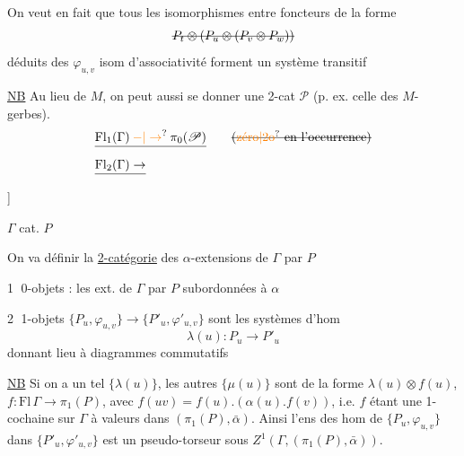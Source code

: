 On veut en fait que tous les isomorphismes
entre foncteurs de la
forme
\[
\deleted{P_t\otimes(P_u\otimes(P_v\otimes P_w))}
\]
déduits des $\varphi_{u,v}$  
isom d'associativité 
forment un système transitif 

\uline{NB} Au lieu de $M$, on peut aussi se donner
une 2-cat  $\mathscr P$ (p. ex. celle des $M$-gerbes).
\[
\begin{aligned}
&\deleted{\mathrm{Fl}_1(\Gamma)\mathbin{\unsure{-|\to}}\pi_0(\mathscr P)}\qquad
\deleted{\text{(\unsure{zéro|2o} en l'occurrence)}}\\
&\deleted{\mathrm{Fl}_2(\Gamma)\to}
\end{aligned}
\]
]

$\Gamma$ cat. \quad $P$ 

On va définir la \uline{2-catégorie} des $\alpha$-extensions
de $\Gamma$ par $P$

\textcircled{1} 0-objets : les ext. de $\Gamma$ par $P$ subordonnées à $\alpha$

\textcircled{2} 1-objets \quad $\{P_u,\varphi_{u,v}\}\longrightarrow\{P'_u,\varphi'_{u,v}\}$
sont les systèmes d'hom
\[
\lambda(u):P_u\to P'_u
\]
donnant lieu à diagrammes commutatifs

\uline{NB} Si on a un tel $\{\lambda(u)\}$, les
autres  $\{\mu(u)\}$ sont de
la forme $\lambda(u)\otimes f(u)$, $f:\mathrm{Fl}\,\Gamma\to\pi_1(P)$,
avec $f(uv)=f(u).(\alpha(u).f(v))$, i.e. $f$ étant
une 1-cochaine sur $\Gamma$ à valeurs dans
$(\pi_1(P),\bar\alpha)$. Ainsi l'ens des hom
de $\{P_u,\varphi_{u,v}\}$ dans $\bigl\{P'_u,\varphi'_{u,v}\bigr\}$ est un
 pseudo-torseur sous $Z^1(\Gamma,(\pi_1(P),\bar\alpha))$.

